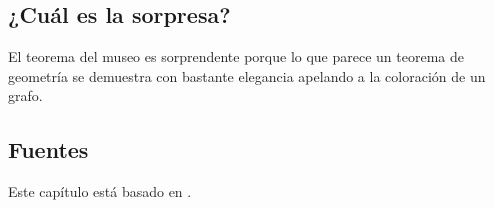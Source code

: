 \subsection*{¿Cuál es la sorpresa?}
El teorema del museo es sorprendente porque lo que parece un teorema de geometría se demuestra con bastante elegancia apelando a la coloración de un grafo.

\subsection*{Fuentes}

Este capítulo está basado en \cite[Capítulo~39]{thebook}.
